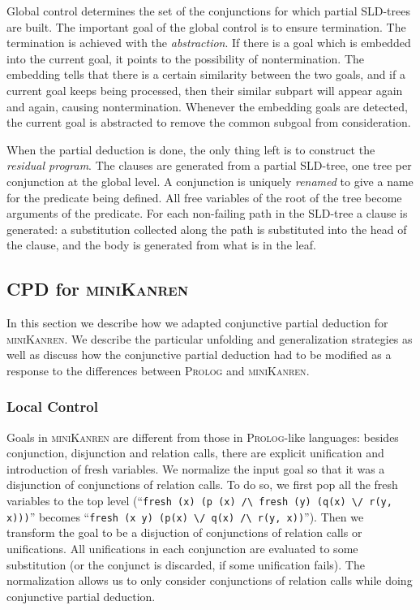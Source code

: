 Global control determines the set of the conjunctions for which partial SLD-trees are built.
The important goal of the global control is to ensure termination.
The termination is achieved with the \emph{abstraction}.
If there is a goal which is embedded into the current goal, it points to the possibility of nontermination. 
The embedding tells that there is a certain similarity between the two goals, and if a current goal keeps being processed, then their similar subpart will appear again and again, causing nontermination.
Whenever the embedding goals are detected, the current goal is abstracted to remove the common subgoal from consideration. 

When the partial deduction is done, the only thing left is to construct the \emph{residual program}.
The clauses are generated from a partial SLD-tree, one tree per conjunction at the global level. 
A conjunction is uniquely \textit{renamed} to give a name for the predicate being defined. 
All free variables of the root of the tree become arguments of the predicate. 
For each non-failing path in the SLD-tree a clause is generated: a substitution collected along the path is substituted into the head of the clause, and the body is generated from what is in the leaf. 

\subsection{CPD for \textsc{miniKanren}}

In this section we describe how we adapted conjunctive partial deduction for \textsc{miniKanren}. 
We describe the particular unfolding and generalization strategies as well as discuss how the conjunctive partial deduction had to be modified as a response to the differences between \textsc{Prolog} and \textsc{miniKanren}. 

\subsubsection{Local Control}

Goals in \textsc{miniKanren} are different from those in \textsc{Prolog}-like languages: besides conjunction, disjunction and relation calls, there are explicit unification and  introduction of fresh variables. 
We normalize the input goal so that it was a disjunction of conjunctions of relation calls. 
To do so, we first pop all the fresh variables to the top level (``\lstinline{fresh (x) (p (x) /\ fresh (y) (q(x) \/ r(y, x)))}'' becomes ``\lstinline{fresh (x y) (p(x) \/ q(x) /\ r(y, x))}''). 
Then we transform the goal to be a disjuction of conjunctions of relation calls or unifications. 
All unifications in each conjunction are evaluated to some substitution (or the conjunct is discarded, if some unification fails). 
The normalization allows us to only consider conjunctions of relation calls while doing conjunctive partial deduction.

